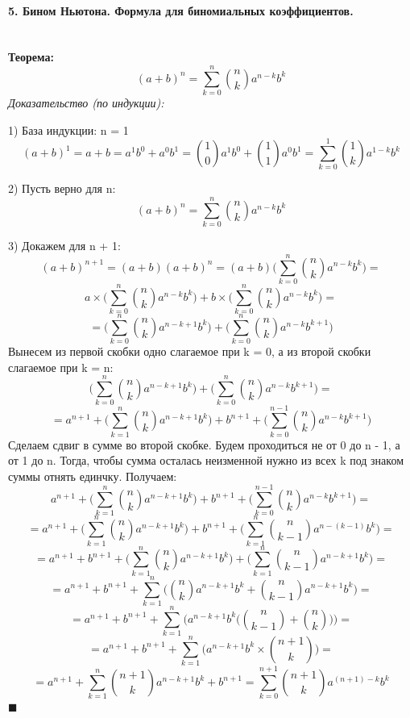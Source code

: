 \documentclass[a4paper, 12pt]{article}
\newcommand{\parag}[1]{\paragraph{#1}\mbox{}\\}
\begin{document}
\parag{5. Бином Ньютона. Формула для биномиальных коэффициентов.}
\textbf{Теорема:}
\[
    (a + b)^{n} = \overset{n}{\underset{k=0}{\sum}} {n \choose k} a^{n - k}b^{k}
\]
\textit{Доказательство (по индукции):}

1) База индукции: n = 1
\[
    (a + b)^{1} = a + b = a^{1}b^{0} + a^{0}b^{1} = {1 \choose 0} a^{1}b^{0} + {1 \choose 1}a^{0}b^{1} = 
    \underset{k=0}{\overset{1}{\sum}} {1 \choose k} a^{1-k}b^{k}
\]

2) Пусть верно для n:
\[
    (a + b)^{n} = \overset{n}{\underset{k=0}{\sum}} {n \choose k} a^{n- k}b^{k}
\]

3) Докажем для n + 1:
\[
    (a + b)^{n+1} = (a + b)(a + b)^{n} = (a + b) \Big(\overset{n}{\underset{k=0}{\sum}} {n \choose k} a^{n- k}b^{k}\Big) = 
\]
\[
    a\times \Big( \overset{n}{\underset{k=0}{\sum}} {n \choose k} a^{n- k}b^{k}\Big) + b \times \Big(\overset{n}{\underset{k=0}{\sum}} {n \choose k} a^{n- k}b^{k}\Big) = 
\]
\[
    = \Big( \overset{n}{\underset{k=0}{\sum}} {n \choose k} a^{n - k + 1}b^{k}\Big) + \Big( \overset{n}{\underset{k=0}{\sum}} {n \choose k} a^{n-k}b^{k + 1}\Big)
\]
Вынесем из первой скобки одно слагаемое при k = 0, а из второй скобки слагаемое при k = n:
\[
    \Big( \overset{n}{\underset{k=0}{\sum}} {n \choose k} a^{n - k + 1}b^{k}\Big) + \Big( \overset{n}{\underset{k=0}{\sum}} {n \choose k} a^{n-k}b^{k + 1}\Big) =
\]
\[
    = a^{n+1} + \Big( \overset{n}{\underset{k=1}{\sum}} {n \choose k} a^{n - k + 1}b^{k}\Big) + b^{n+1} + \Big( \overset{n-1}{\underset{k=0}{\sum}} {n \choose k} a^{n-k}b^{k + 1}\Big)
\]
Сделаем сдвиг в сумме во второй скобке. Будем проходиться не от 0 до n - 1, а от 1 до n. Тогда, чтобы сумма осталась неизменной нужно из всех k под знаком суммы отнять единчку. Получаем:
\[
    a^{n+1} + \Big( \overset{n}{\underset{k=1}{\sum}} {n \choose k} a^{n - k + 1}b^{k}\Big) + b^{n+1} + \Big( \overset{n-1}{\underset{k=0}{\sum}} {n \choose k} a^{n-k}b^{k + 1}\Big) =
\]
\[
    = a^{n+1} + \Big( \overset{n}{\underset{k=1}{\sum}} {n \choose k} a^{n - k + 1}b^{k}\Big) + b^{n+1} + \Big( \overset{n}{\underset{k=1}{\sum}} {n \choose k - 1} a^{n-(k-1)}b^{k}\Big) = 
\]
\[
    = a^{n+1} + b^{n+1} + \Big( \overset{n}{\underset{k=1}{\sum}} {n \choose k} a^{n - k + 1}b^{k}\Big) + \Big( \overset{n}{\underset{k=1}{\sum}} {n \choose k - 1} a^{n-k+1}b^{k}\Big) =
\]
\[
    = a^{n+1} + b^{n+1} +  \overset{n}{\underset{k=1}{\sum}} \Big({n \choose k} a^{n - k + 1}b^{k} + {n \choose k - 1} a^{n-k+1}b^{k}\Big) =
\]
\[
    =  a^{n+1} + b^{n+1} +  \overset{n}{\underset{k=1}{\sum}} \Big( a^{n - k + 1}b^{k} \big( {n \choose k - 1} + {n \choose k} \big)\Big) =
\]
\[
    =  a^{n+1} + b^{n+1} +  \overset{n}{\underset{k=1}{\sum}} \Big( a^{n - k + 1}b^{k} \times {n + 1 \choose k}\Big) =
\]
\[
    = a^{n+1} + \overset{n}{\underset{k=1}{\sum}} {n + 1 \choose k} a^{n - k + 1}b^{k} + b^{n+1} = 
    \overset{n + 1}{\underset{k=0}{\sum}} {n + 1 \choose k} a^{(n+1)- k}b^{k}
\]
$\blacksquare$
\end{document}
